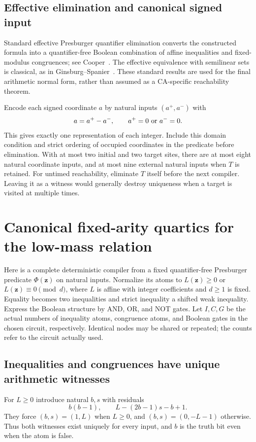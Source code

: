 \documentclass[11pt,letterpaper]{article}
\numberwithin{equation}{section}
\theoremstyle{definition}
\theoremstyle{remark}
\begin{document}
\subsection{Effective elimination and canonical signed input}
Standard effective Presburger quantifier elimination converts the constructed formula into a quantifier-free Boolean combination of affine inequalities and fixed-modulus congruences; see Cooper~\cite{cooper}. The effective equivalence with semilinear sets is classical, as in Ginsburg--Spanier~\cite{ginsburgspanier}. These standard results are used for the final arithmetic normal form, rather than assumed as a CA-specific reachability theorem.

Encode each signed coordinate $a$ by natural inputs $(a^+,a^-)$ with
\[
 a=a^+-a^-,\qquad a^+=0\ \hbox{or}\ a^-=0.
\]
This gives exactly one representation of each integer. Include this domain condition and strict ordering of occupied coordinates in the predicate before elimination. With at most two initial and two target sites, there are at most eight natural coordinate inputs, and at most nine external natural inputs when $T$ is retained. For untimed reachability, eliminate $T$ itself before the next compiler. Leaving it as a witness would generally destroy uniqueness when a target is visited at multiple times.

\section{Canonical fixed-arity quartics for the low-mass relation}\label{smc:sl:sec:presburger-quartic}
Here is a complete deterministic compiler from a fixed quantifier-free Presburger predicate $\Phi(\mathbf z)$ on natural inputs. Normalize its atoms to $L(\mathbf z)\ge0$ or $L(\mathbf z)\equiv0\pmod d$, where $L$ is affine with integer coefficients and $d\ge1$ is fixed. Equality becomes two inequalities and strict inequality a shifted weak inequality. Express the Boolean structure by AND, OR, and NOT gates. Let $I,C,G$ be the actual numbers of inequality atoms, congruence atoms, and Boolean gates in the chosen circuit, respectively. Identical nodes may be shared or repeated; the counts refer to the circuit actually used.

\subsection{Inequalities and congruences have unique arithmetic witnesses}
For $L\ge0$ introduce natural $b,s$ with residuals
\[
 b(b-1),\qquad L-(2b-1)s-b+1.
\]
They force $(b,s)=(1,L)$ when $L\ge0$, and $(b,s)=(0,-L-1)$ otherwise. Thus both witnesses exist uniquely for every input, and $b$ is the truth bit even when the atom is false.
\end{document}

